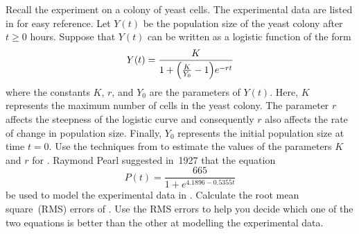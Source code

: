 \documentclass[a4paper,oneside,12pt]{article}
\begin{document}
\begin{problem}
\begin{packedenum}
  \item\label{subprob:logarithm:logistic_yeast}
    Recall the experiment on a colony of yeast cells.  The
    experimental data are listed in  for
    easy reference.  Let $Y(t)$ be the population size of the yeast
    colony after $t \geq 0$ hours.  Suppose that $Y(t)$ can be written
    as a logistic function of the form
    \begin{equation}
    \label{eqn:logarithm:logistic_yeast}
    Y(t)
    =
    \frac{
      K
    }{
      1
      +
      \parenthesis*{\frac{K}{Y_0} - 1}
      e^{-rt}
    }
    \end{equation}
    where the constants $K$, $r$, and $Y_0$ are the parameters of
    $Y(t)$.  Here, $K$ represents the maximum number of cells in the
    yeast colony.  The parameter $r$ affects the steepness of the
    logistic curve and consequently $r$ also affects the rate of
    change in population size.  Finally, $Y_0$ represents the initial
    population size at time $t = 0$.  Use the techniques
    from 
    to estimate the values of the parameters $K$ and $r$ for
    .  Raymond Pearl suggested
    in~1927 that the equation
    \begin{equation}
    \label{eqn:logarithm:logistic_Pearl}
    P(t)
    =
    \frac{
      665
    }{
      1 + e^{4.1896 - 0.5355t}
    }
    \end{equation}
    be used to model the experimental data in
    .  Calculate the root mean square~(RMS)
    errors of
    .
    Use the RMS errors to help you decide which one of the two
    equations is better than the other at modelling the experimental
    data.
  \end{packedenum}
\end{problem}
\end{document}
